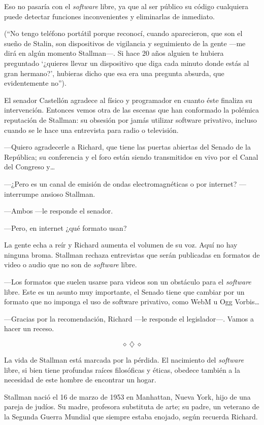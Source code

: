 \documentclass[oneside,twocolumn]{article}
\begin{document}
Eso no pasaría con el \emph{software} libre, ya que al ser público su código cualquiera puede
detectar funciones inconvenientes y eliminarlas de inmediato.

(``No tengo teléfono portátil porque reconocí, cuando aparecieron, que son el sueño de Stalin, 
son dispositivos de vigilancia y seguimiento de la gente ---me dirá en algún momento Stallman---. Si 
hace 20 años alguien te hubiera preguntado `¿quieres llevar un dispositivo que diga cada minuto donde 
estás al gran hermano?', hubieras dicho que esa era una pregunta absurda, que evidentemente no'').

El senador Castellón agradece al físico y programador en cuanto éste finaliza su intervención. 
Entonces vemos otra de las escenas que han conformado la polémica reputación de Stallman: su 
obsesión por jamás utilizar software privativo, incluso cuando se le hace 
una entrevista para radio o televisión.

---Quiero agradecerle a Richard, que tiene las puertas abiertas del Senado de la República; su
conferencia y el foro están siendo transmitidos en vivo por el Canal del Congreso y\ldots

---¿Pero es un canal de emisión de ondas electromagnéticas o por internet? ---interrumpe ansioso 
Stallman.

---Ambos ---le responde el senador.

---Pero, en internet ¿qué formato usan?

La gente echa a reír y Richard aumenta el volumen de su voz. Aquí no hay ninguna broma. Stallman 
rechaza entrevistas que serán publicadas en formatos de video o audio que no son de \emph{software}
libre.

---Los formatos que suelen usarse para videos son un obstáculo para el \emph{software} libre. 
Este es un asunto muy importante, el Senado tiene que cambiar por un formato que no imponga el uso 
de software privativo, como WebM u Ogg Vorbis\ldots

---Gracias por la recomendación, Richard ---le responde el legislador---. Vamos a hacer un receso.

\[\diamond~\diamondsuit~\diamond\]

La vida de Stallman está marcada por la pérdida. El nacimiento del \emph{software} libre, si 
bien tiene profundas raíces filosóficas y éticas, obedece también a la necesidad de este hombre de 
encontrar un hogar.

Stallman nació el 16 de marzo de 1953 en Manhattan, Nueva York, hijo de una pareja de judíos. 
Su madre, profesora substituta de arte; su padre, un veterano de la Segunda Guerra Mundial que 
siempre estaba enojado, según recuerda Richard.
\end{document}
